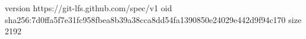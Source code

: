 version https://git-lfs.github.com/spec/v1
oid sha256:7d0ffa5f7e31fc958fbea8b39a38cca8dd54fa1390850e24029e442d9f94c170
size 2192
